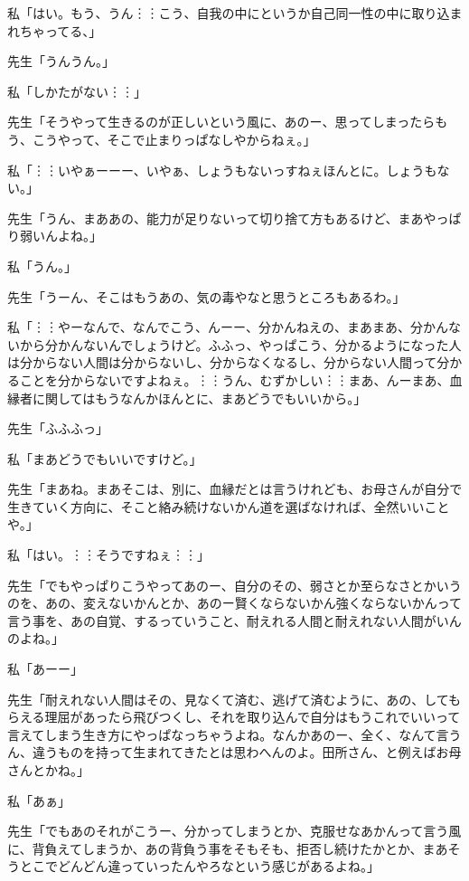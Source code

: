 \documentclass[b5j,twoside,twocolumn]{utarticle}
\begin{document}
\begin{description}
\item 私「はい。もう、うん︙︙こう、自我の中にというか自己同一性の中に取り込まれちゃってる、」
\item 先生「うんうん。」
\item 私「しかたがない︙︙」
\item 先生「そうやって生きるのが正しいという風に、あのー、思ってしまったらもう、こうやって、そこで止まりっぱなしやからねぇ。」
\item 私「︙︙いやぁーーー、いやぁ、しょうもないっすねぇほんとに。しょうもない。」
\item 先生「うん、まああの、能力が足りないって切り捨て方もあるけど、まあやっぱり弱いんよね。」
\item 私「うん。」
\item 先生「うーん、そこはもうあの、気の毒やなと思うところもあるわ。」
\item 私「︙︙やーなんで、なんでこう、んーー、分かんねえの、まあまあ、分かんないから分かんないんでしょうけど。ふふっ、やっぱこう、分かるようになった人は分からない人間は分からないし、分からなくなるし、分からない人間って分かることを分からないですよねぇ。︙︙うん、むずかしい︙︙まあ、んーまあ、血縁者に関してはもうなんかほんとに、まあどうでもいいから。」
\item 先生「ふふふっ」
\item 私「まあどうでもいいですけど。」
\item 先生「まあね。まあそこは、別に、血縁だとは言うけれども、お母さんが自分で生きていく方向に、そこと絡み続けないかん道を選ばなければ、全然いいことや。」
\item 私「はい。︙︙そうですねぇ︙︙」
\item 先生「でもやっぱりこうやってあのー、自分のその、弱さとか至らなさとかいうのを、あの、変えないかんとか、あのー賢くならないかん強くならないかんって言う事を、あの自覚、するっていうこと、耐えれる人間と耐えれない人間がいんのよね。」
\item 私「あーー」
\item 先生「耐えれない人間はその、見なくて済む、逃げて済むように、あの、してもらえる理屈があったら飛びつくし、それを取り込んで自分はもうこれでいいって言えてしまう生き方にやっぱなっちゃうよね。なんかあのー、全く、なんて言うん、違うものを持って生まれてきたとは思わへんのよ。田所さん、と例えばお母さんとかね。」
\item 私「あぁ」
\item 先生「でもあのそれがこうー、分かってしまうとか、克服せなあかんって言う風に、背負えてしまうか、あの背負う事をそもそも、拒否し続けたかとか、まあそうとこでどんどん違っていったんやろなという感じがあるよね。」

\end{description}
\end{document}
